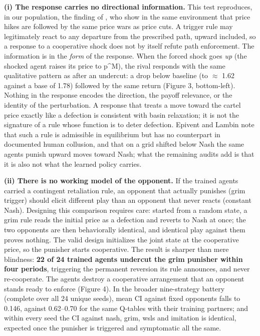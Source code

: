 \documentclass[sigconf]{acmart}
\begin{document}
\textbf{(i) The response carries no directional information.} This test
reproduces, in our population, the finding of \citet{epivent2024}, who
show in the same environment that price hikes are followed by the same
price wars as price cuts. A trigger rule may legitimately react to any
departure from the prescribed path, upward included, so a response to a
cooperative shock does not by itself refute path enforcement. The
information is in the \emph{form} of the response. When the forced shock
goes \emph{up} (the shocked agent raises its price to p\^{}M), the rival
responds with the same qualitative pattern as after an undercut: a drop
below baseline (to \ensuremath{\approx} 1.62 against a base of 1.78)
followed by the same return (Figure 3, bottom-left). Nothing in the
response encodes the direction, the payoff relevance, or the identity of
the perturbation. A response that treats a move toward the cartel price
exactly like a defection is consistent with basin relaxation; it is not
the signature of a rule whose function is to deter defection. Epivent
and Lambin note that such a rule is admissible in equilibrium but has no
counterpart in documented human collusion, and that on a grid shifted
below Nash the same agents punish upward moves toward Nash; what the
remaining audits add is that it is also not what the learned policy
carries.

\textbf{(ii) There is no working model of the opponent.} If the trained
agents carried a contingent retaliation rule, an opponent that actually
punishes (grim trigger) should elicit different play than an opponent
that never reacts (constant Nash). Designing this comparison requires
care: started from a random state, a grim rule reads the initial price
as a defection and reverts to Nash at once; the two opponents are then
behaviorally identical, and identical play against them proves nothing.
The valid design initializes the joint state at the cooperative price,
so the punisher starts cooperative. The result is sharper than mere
blindness: \textbf{22 of 24 trained agents undercut the grim punisher
within four periods}, triggering the permanent reversion its rule
announces, and never re-cooperate. The agents destroy a cooperative
arrangement that an opponent stands ready to enforce (Figure 4). In the
broader nine-strategy battery (complete over all 24 unique seeds), mean
CI against fixed opponents falls to 0.146, against 0.62--0.70 for the
same Q-tables with their training partners; and within every seed the CI
against nash, grim, wsls and imitation is identical, expected once the
punisher is triggered and symptomatic all the same.
\end{document}
